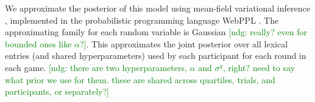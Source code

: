 \documentclass[10pt,letterpaper]{article}
\newcommand{\ndg}[1]{\textcolor{Green}{[ndg: #1]}}
\begin{document}
We approximate the posterior of this model using mean-field variational inference \cite{RanganathGerrishBlei13_BlackBoxVariationalInference}, implemented in the probabilistic programming language WebPPL \cite{GoodmanStuhlmuller14_DIPPL,DAIPP}. 
The approximating family for each random variable is Gaussian \ndg{really? even for bounded ones like $\alpha$?}.
This approximates the joint posterior over all lexical entries (and shared hyperparameters) used by each participant for each round in each game. 
\ndg{there are two hyperparameters, $\alpha$ and $\sigma^q$, right? need to say what prior we use for them. these are shared across quartiles, trials, and participants, or separately?}




\end{document}
